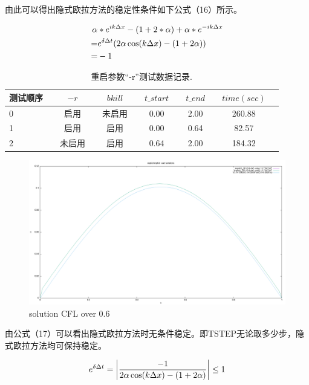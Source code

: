 \documentclass[final]{cvpr}
\begin{document}
由此可以得出隐式欧拉方法的稳定性条件如下公式（16）所示。
\begin{center}
	\begin{scriptsize}
		\begin{equation}
			\begin{aligned}
				\setlength{\abovedisplayskip}{-5pt}			
					\alpha& * e^{i k \Delta x}-(1+2 * \alpha)+\alpha * e^{-i k \Delta x}\\
					=& e^{\delta \Delta t}(2 \alpha \cos (k \Delta x)-(1+2 \alpha))\\
					=&-1
			\end{aligned}
		\end{equation}
	\end{scriptsize}
\end{center}
\begin{table}[b]
	\centering
	\caption{重启参数“-r”测试数据记录.}
	\label{tab:univ-compa1}
	\begin{tabular}{lccccccccccc}
		\toprule
		\textbf{测试顺序} && \textbf{$-r$} && \textbf{$bkill$}&& \textbf{$t\_start$}&& \textbf{$t\_end$}&& \textbf{$time(sec)$}\\ \midrule
		0 && 启用 && 未启用 && 0.00 && 2.00 && 260.88  \\ 
		1 && 启用 && 启用  	  && 0.00 && 0.64 && 82.57 \\ 
		2  &&未启用 &&启用  && 0.64 && 2.00 && 184.32  \\
		\bottomrule
	\end{tabular}
\end{table}
\begin{figure}[t]
	\centering
	\includegraphics[scale=0.18]{./figures/solution_CFL_over05.png}
	\caption{solution CFL over 0.6}
	\label{figure}
\end{figure}
由公式（17）可以看出隐式欧拉方法时无条件稳定。即TSTEP无论取多少步，隐式欧拉方法均可保持稳定。
\begin{center}
	\begin{scriptsize}
		\begin{equation}
				\setlength{\abovedisplayskip}{-5pt}			
e^{\delta \Delta t}=\left|\frac{-1}{2 \alpha \cos (k \Delta x)-(1+2 \alpha)}\right| \leq 1
		\end{equation}
	\end{scriptsize}
\end{center}
\end{document}
